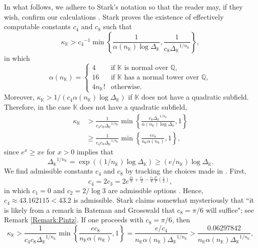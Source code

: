 \documentclass[10pt,reqno]{amsart}
\theoremstyle{plain}
\theoremstyle{definition}
\newcommand{\Q}{\mathbb{Q}}
\newcommand{\K}{\mathbb{K}}
\begin{document}
In what follows, we adhere to Stark's notation so that the reader may, if they wish,
confirm our calculations \cite{StarkBS}.
Stark proves the existence of effectively computable constants $c_4$ and $c_8$ such that
\begin{equation}
    \kappa_{\K} > {c_4}^{-1}\min\left\{\frac{1}{\alpha(n_{\K})\log{\Delta_{\K}}}, \frac{1}{c_8{\Delta_{\K}}^{1/n_{\K}}}\right\},
\end{equation}
in which
\begin{equation*}
    \alpha(n_{\K})=
    \begin{cases}
    4&\text{if }\K\text{ is normal over }\Q,\\
    16&\text{if }\K\text{ has a normal tower over }\Q,\\
    4n_{\K}!&\text{otherwise.}
    \end{cases}
\end{equation*}
Moreover, $\kappa_{\K} > 1/(c_4\alpha(n_{\K})\log{\Delta_{\K}})$ if $\K$ does not have a quadratic subfield. Therefore, in the case $\K$ does not have a quadratic subfield, 
\begin{align*}
    \kappa_{\K}
    &> \frac{1}{c_4c_8 {\Delta_{\K}}^{1/n_{\K}}} \min\left\{\frac{c_8{\Delta_{\K}}^{1/n_{\K}}}{\alpha(n_{\K})\log{\Delta_{\K}}}, 1\right\}\\
    &\geq \frac{1}{c_4c_8 {\Delta_{\K}}^{1/n_{\K}}} \min\left\{\frac{e c_8}{n_{\K}\alpha(n_{\K})}, 1\right\},
\end{align*}
since $e^x \geq x e$ for $x>0$ implies that 
$${\Delta_{\K}}^{1/n_{\K}} = \exp((1/n_{\K})\log{\Delta_{\K}}) \geq (e/n_{\K})\log{\Delta_{\K}}.$$ 
We find admissible constants $c_4$ and $c_8$ by tracking the 
choices made in \cite{StarkBS}. First,
\begin{equation*}
    c_4 = 2c_3 = 2e^{\frac{21}{8} + \frac{c_1}{2} - \frac{c_2}{8}\frac{\Gamma'}{\Gamma}\left(\frac{1}{2}\right)},
\end{equation*}
in which $c_1 = 0$ and $c_2 = 2/\log{3}$ are admissible options \cite[Lemma 4]{StarkBS}. Hence, $c_4 \approx 43.162115 < 43.2$ is admissible. 
Stark claims somewhat mysteriously that ``it is likely from a remark in Bateman and Grosswald \cite[p.~188]{batemanGrosswald} that $c_8 = \pi/6$ will suffice"; see Remark \ref{Remark:Pintz}.
If one proceeds with $c_8 = \pi/6$, then 
\begin{equation*}
    \kappa_{\K}
    > \frac{1}{c_4c_8 {\Delta_{\K}}^{1/n_{\K}}} \min\left\{\frac{ec_8}{n_{\K}\alpha(n_{\K})}, 1\right\}
    = \frac{e/c_4}{n_{\K}\alpha(n_{\K}){\Delta_{\K}}^{1/n_{\K}}}
    > \frac{0.06297842}{n_{\K}\alpha(n_{\K}){\Delta_{\K}}^{1/n_{\K}}},
\end{equation*}
\end{document}
